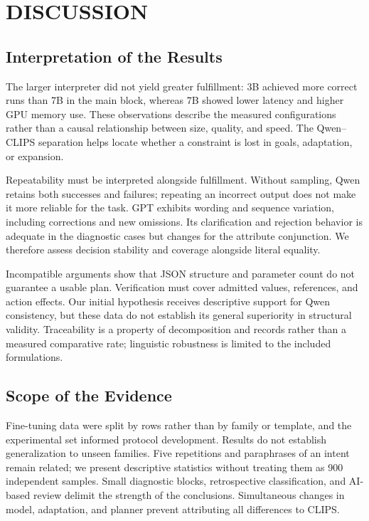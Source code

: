 \documentclass[a4paper,twoside]{article}
\begin{document}
\section{DISCUSSION}
\subsection{Interpretation of the Results}
The larger interpreter did not yield greater fulfillment: 3B achieved more correct runs than 7B in the main block, whereas 7B showed lower latency and higher GPU memory use. These observations describe the measured configurations rather than a causal relationship between size, quality, and speed. The Qwen--CLIPS separation helps locate whether a constraint is lost in goals, adaptation, or expansion.

Repeatability must be interpreted alongside fulfillment. Without sampling, Qwen retains both successes and failures; repeating an incorrect output does not make it more reliable for the task. GPT exhibits wording and sequence variation, including corrections and new omissions. Its clarification and rejection behavior is adequate in the diagnostic cases but changes for the attribute conjunction. We therefore assess decision stability and coverage alongside literal equality.

Incompatible arguments show that JSON structure and parameter count do not guarantee a usable plan. Verification must cover admitted values, references, and action effects. Our initial hypothesis receives descriptive support for Qwen consistency, but these data do not establish its general superiority in structural validity. Traceability is a property of decomposition and records rather than a measured comparative rate; linguistic robustness is limited to the included formulations.

\subsection{Scope of the Evidence}
Fine-tuning data were split by rows rather than by family or template, and the experimental set informed protocol development. Results do not establish generalization to unseen families. Five repetitions and paraphrases of an intent remain related; we present descriptive statistics without treating them as 900 independent samples. Small diagnostic blocks, retrospective classification, and AI-based review delimit the strength of the conclusions. Simultaneous changes in model, adaptation, and planner prevent attributing all differences to CLIPS.
\end{document}
